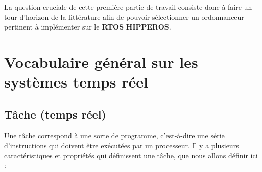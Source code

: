 \documentclass[11pt,a4paper,oneside]{report}
\newcommand{\customhighlight}[1]{{\textbf{#1}}}
\begin{document}
	La question cruciale de cette première partie de travail 
	consiste donc à faire un tour d'horizon de la littérature afin de pouvoir 
	sélectionner un ordonnanceur pertinent à implémenter sur le \customhighlight{RTOS} \customhighlight{HIPPEROS}.
	
	\section{Vocabulaire général sur les systèmes temps réel}
	
	\subsection{Tâche (temps réel)}
	Une tâche correspond à une sorte de programme, c'est-à-dire une série d'instructions 
	qui doivent être exécutées par un processeur. 
	Il y a plusieurs caractéristiques 
	et propriétés qui définissent une tâche, que nous allons définir ici : 
\end{document}
